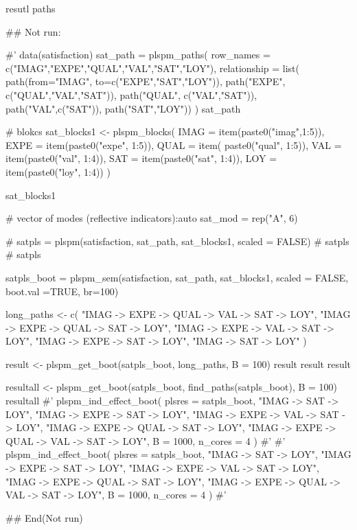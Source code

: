 \documentclass[a4paper]{book}
\begin{document}
%
\begin{Value}
resutl paths
\end{Value}
%
\begin{Examples}
\begin{ExampleCode}

\#\# Not run: 

#'
data(satisfaction)
sat_path = plspm_paths(
  row_names = c("IMAG","EXPE","QUAL","VAL","SAT","LOY"),
  relationship = list(
    path(from="IMAG", to=c("EXPE","SAT","LOY")),
    path("EXPE", c("QUAL","VAL","SAT")),
    path("QUAL", c("VAL","SAT")),
    path("VAL",c("SAT")),
    path("SAT","LOY"))
)
sat_path

# blokcs
sat_blocks1 <- plspm_blocks(
  IMAG = item(paste0("imag",1:5)),
  EXPE = item(paste0("expe", 1:5)),
  QUAL = item( paste0("qual", 1:5)),
  VAL = item(paste0("val", 1:4)),
  SAT = item(paste0("sat", 1:4)),
  LOY = item(paste0("loy", 1:4))
)

sat_blocks1

# vector of modes (reflective indicators):auto
sat_mod = rep("A", 6)

# satpls = plspm(satisfaction, sat_path, sat_blocks1, scaled = FALSE)
# satpls
# satpls %

satpls_boot = plspm_sem(satisfaction, sat_path, sat_blocks1, scaled = FALSE,
                        boot.val =TRUE, br=100)


long_paths <- c(
  "IMAG -> EXPE -> QUAL -> VAL -> SAT -> LOY",
  "IMAG -> EXPE -> QUAL -> SAT -> LOY",
  "IMAG -> EXPE -> VAL -> SAT -> LOY",
  "IMAG -> EXPE -> SAT -> LOY",
  "IMAG -> SAT -> LOY"
)

result <- plspm_get_boot(satpls_boot, long_paths, B = 100)
result
result %
result %

resultall <- plspm_get_boot(satpls_boot, find_paths(satpls_boot), B = 100)
resultall
#'
plspm_ind_effect_boot(
  plsres = satpls_boot,
  "IMAG -> SAT -> LOY",
  "IMAG -> EXPE -> SAT -> LOY",
  "IMAG -> EXPE -> VAL -> SAT -> LOY",
  "IMAG -> EXPE -> QUAL -> SAT -> LOY",
  "IMAG -> EXPE -> QUAL -> VAL -> SAT -> LOY",
  B = 1000,
  n_cores = 4
)%
#'
#'
plspm_ind_effect_boot(
  plsres = satpls_boot,
  "IMAG -> SAT -> LOY",
  "IMAG -> EXPE -> SAT -> LOY",
  "IMAG -> EXPE -> VAL -> SAT -> LOY",
  "IMAG -> EXPE -> QUAL -> SAT -> LOY",
  "IMAG -> EXPE -> QUAL -> VAL -> SAT -> LOY",
  B = 1000,
  n_cores = 4
)
#'



## End(Not run)




\end{ExampleCode}
\end{Examples}
\end{document}

